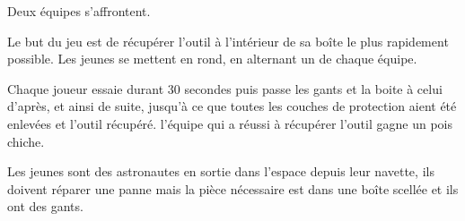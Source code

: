 \documentclass{grand-jeu}
\begin{document}
\begin{liste-materiel}
\end{liste-materiel}

\begin{regles}
Deux équipes s’affrontent.

Le but du jeu est de récupérer l’outil à l’intérieur de sa boîte le plus rapidement possible. Les jeunes se mettent en rond, en alternant un de chaque équipe.

Chaque joueur essaie durant 30 secondes puis passe les gants et la boite à celui d’après, et ainsi de suite, jusqu’à ce que toutes les couches de protection aient été enlevées et l’outil récupéré. l’équipe qui a réussi à récupérer l’outil gagne un pois chiche.
\end{regles}

\begin{imaginaire}
Les jeunes sont des astronautes en sortie dans l’espace depuis leur navette, ils doivent réparer une panne mais la pièce nécessaire est dans une boîte scellée et ils ont des gants.
\end{imaginaire}

\begin{moments-stop}
\end{moments-stop}
\end{document}
